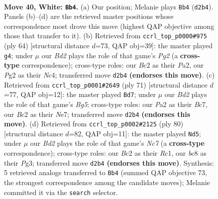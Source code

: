 \documentclass[11pt]{article}
\begin{document}
\clearpage

\begin{figure}[p]\centering
\begin{subfigure}{0.46\textwidth}\centering
\resizebox{\linewidth}{!}{%
\newchessgame
\chessboard[
  setfen={r1bq3k/ppp2pp1/5n2/7p/8/4QPbP/PPBB2P1/R5K1 w - - 0 40},
  showmover=false,
  pgfstyle=straightmove, color=movearrow, markmove={d2-b4}
]}
\caption{}
\end{subfigure}\hfill
\begin{subfigure}{0.46\textwidth}\centering
\resizebox{\linewidth}{!}{%
\newchessgame
\chessboard[
  setfen={3r2k1/1q3pp1/p4n1p/5P1b/2N5/4Q2P/P5P1/1BR3K1 w - - 1 33},
  showmover=false,
  pgfstyle=straightmove, color=movearrow, markmove={g2-g4}
]}
\caption{}
\end{subfigure}
\\[4pt]
\begin{subfigure}{0.46\textwidth}\centering
\resizebox{\linewidth}{!}{%
\newchessgame
\chessboard[
  setfen={6k1/2b1nqp1/1p1p3p/2p5/P1P3b1/2B1P1P1/2Q1B2P/5NK1 b - - 4 36},
  showmover=false,
  pgfstyle=straightmove, color=movearrow, markmove={g4-d7}
]}
\caption{}
\end{subfigure}\hfill
\begin{subfigure}{0.46\textwidth}\centering
\resizebox{\linewidth}{!}{%
\newchessgame
\chessboard[
  setfen={1r4k1/p1N1qpb1/3p2p1/P6p/4nP2/4P1P1/2Q4P/2R2BK1 w - - 7 41},
  showmover=false,
  pgfstyle=straightmove, color=movearrow, markmove={c7-d5}
]}
\caption{}
\end{subfigure}
\caption{\textbf{Move 40, White: \texttt{Bb4}.} (a) Our position; Melanie plays \texttt{Bb4} (\texttt{d2b4}). Panels (b)--(d) are the retrieved master positions whose correspondence most drove this move (highest QAP objective among those that transfer to it). (b) Retrieved from \texttt{ccrl\_top\_p0000\#975} (ply 64) [structural distance $d$=73, QAP obj=39]: the master played \texttt{g4}; under $\mu$ our \emph{Bd2} plays the role of that game's \emph{Pg2} (a \textbf{cross-type} correspondence); cross-type roles: our \emph{B}c2 as their \emph{P}a2, our \emph{P}g2 as their \emph{N}c4; transferred move \texttt{d2b4} \textbf{(endorses this move)}. (c) Retrieved from \texttt{ccrl\_top\_p0001\#2649} (ply 71) [structural distance $d$=77, QAP obj=12]: the master played \texttt{Bd7}; under $\mu$ our \emph{Bd2} plays the role of that game's \emph{Bg5}; cross-type roles: our \emph{P}a2 as their \emph{B}c7, our \emph{B}c2 as their \emph{N}e7; transferred move \texttt{d2b4} \textbf{(endorses this move)}. (d) Retrieved from \texttt{ccrl\_top\_p0002\#2125} (ply 80) [structural distance $d$=82, QAP obj=11]: the master played \texttt{Nd5}; under $\mu$ our \emph{Bd2} plays the role of that game's \emph{Nc7} (a \textbf{cross-type} correspondence); cross-type roles: our \emph{B}c2 as their \emph{R}c1, our \emph{b}c8 as their \emph{P}g3; transferred move \texttt{d2b4} \textbf{(endorses this move)}. Synthesis: 5 retrieved analogs transferred to \texttt{Bb4} (summed QAP objective 73, the strongest correspondence among the candidate moves); Melanie committed it via the \texttt{search} selector.}
\label{fig:thought-m78}
\end{figure}
\end{document}
